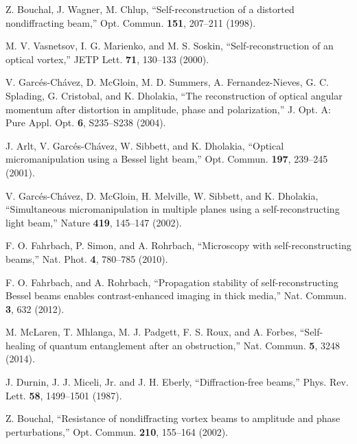 \documentclass[10pt]{article}
\begin{document}

\begin{thebibliography}{99}

Z. Bouchal, J. Wagner, M. Chlup,
  ``Self-reconstruction of a distorted nondiffracting beam,'' 
Opt. Commun. \textbf{151}, 207--211 (1998).

M. V. Vasnetsov, I. G. Marienko, and  M. S. Soskin, 
``Self-reconstruction of an optical vortex,'' 
JETP Lett. \textbf{71}, 130--133 (2000).

V. Garc\'es-Ch\'avez, D. McGloin,  M. D. Summers, 
A. Fernandez-Nieves,  G. C. Splading, G. Cristobal,
 and K. Dholakia, 
``The reconstruction of optical angular momentum  after distortion in
amplitude, phase and polarization,'' 
J. Opt. A:  Pure Appl. Opt. \textbf{6}, S235--S238 (2004).

J. Arlt, V. Garc\'es-Ch\'avez, W. Sibbett, and K. Dholakia, 
``Optical micromanipulation using a Bessel light  beam,'' 
Opt. Commun. \textbf{197}, 239--245 (2001).

V. Garc\'{e}s-Ch\'{a}vez, D. McGloin,   H. Melville, W. Sibbett, and
K. Dholakia,
 ``Simultaneous   micromanipulation in multiple planes using a self-reconstructing
  light beam,''  
Nature \textbf{419}, 145--147 (2002).

F. O. Fahrbach, P. Simon, and A. Rohrbach,
  ``Microscopy with self-reconstructing beams,''
  Nat. Phot. \textbf{4}, 780--785 (2010).

F. O. Fahrbach, and A. Rohrbach,
  ``Propagation stability of self-reconstructing Bessel beams enables
  contrast-enhanced imaging in thick media,'' 
Nat. Commun. \textbf{3}, 632  (2012).

M. McLaren, T. Mhlanga, M. J. Padgett,  F. S. Roux, and A. Forbes, 
``Self-healing of quantum entanglement  after an obstruction,'' 
Nat. Commun. \textbf{5}, 3248 (2014).

J. Durnin, J. J. Miceli, Jr. and J. H. Eberly, 
``Diffraction-free beams,'' 
Phys. Rev. Lett. \textbf{58}, 1499--1501 (1987).

Z. Bouchal, 
``Resistance of nondiffracting vortex beams to amplitude and phase
perturbations,''  
Opt. Commun. \textbf{210}, 155--164 (2002).


\end{thebibliography}
\end{document}
